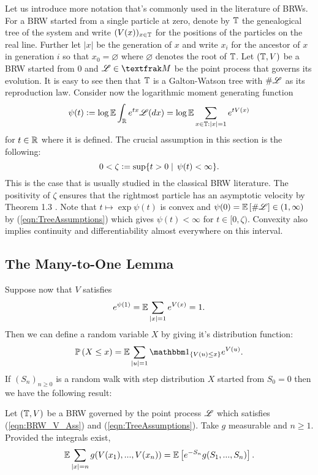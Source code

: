 Let us introduce more notation that's commonly used in the literature of BRWs. For a BRW started from a single particle at zero, denote by $\mathbb{T}$ the genealogical tree of the system and write $(V(x))_{x \in \mathbb{T}}$ for the positions of the particles on the real line. Further let $|x|$ be the generation of $x$ and write $x_i$ for the ancestor of $x$ in generation $i$ so that $x_0 = \varnothing$ where $\varnothing$ denotes the root of $\mathbb{T}$. Let $(\mathbb{T}, V)$ be a BRW started from $0$ and $\scr{L} \in \frak{M}$ be the point process that governs its evolution. It is easy to see then that $\mathbb{T}$ is a Galton-Watson tree with $\# \mathscr{L}$ as its reproduction law. Consider now the logarithmic moment generating function
\begin{equation}\nonumber
\psi(t) \vcentcolon= \log \mathbb{E} \int_{\mathbb{R}} e^{t x} \mathscr{L}(dx) = \log \mathbb{E} \sum\limits_{x \in \mathbb{T}: |x|=1} e^{t V(x)} 
\end{equation}
for $t \in \mathbb{R}$ where it is defined. The crucial assumption in this section is the following: 
\begin{equation}\label{eqn:BRW_generator_finite}
0 < \zeta \vcentcolon= \sup\{ t > 0 \mid\, \psi(t) < \infty \}. 
\end{equation}
This is the case that is usually studied in the classical BRW literature. The positivity of $\zeta$ ensures that the rightmost particle has an asymptotic velocity by Theorem 1.3 \cite{shi2015branching}. Note that $t \mapsto \exp \psi(t)$ is convex and $\psi(0) = \mathbb{E}\left[ \# \mathscr{L} \right] \in (1, \infty)$ by (\ref{eqn:TreeAssumptions}) which gives $\psi(t) < \infty$ for $t \in [0, \zeta)$. Convexity also implies continuity and differentiability almost everywhere on this interval. 




\subsection{The Many-to-One Lemma}

Suppose now that $V$ satisfies
\begin{equation}\label{eqn:BRW_V_Ass}
e^{\psi(1)} = \mathbb{E} \sum\limits_{|x|=1} e^{V(x)} = 1. 
\end{equation}
Then we can define a random variable $X$ by giving it's distribution function: 
\begin{equation}\nonumber
\Pr{X \leq x} = \E \sum\limits_{|u| = 1} \Ind_{\{V(u) \leq x\}} e^{V(u)}. 
\end{equation}
If $(S_n)_{n\geq0}$ is a random walk with step distribution $X$ started from $S_0 = 0$ then we have the following result:
\begin{lemma}\label{lem:many_to_one}
Let $(\mathbb{T}, V)$ be a BRW governed by the point process $\mathscr{L}$ which satisfies (\ref{eqn:BRW_V_Ass}) and (\ref{eqn:TreeAssumptions}). Take $g$ measurable and $n \geq 1$. Provided the integrals exist, 
\begin{equation}\nonumber
\mathbb{E} \sum\limits_{|x| = n} g(V(x_1), ...,V(x_n)) = \mathbb{E}\left[ e^{-S_n} g(S_1, ...,S_n) \right]. 
\end{equation}
\end{lemma}

